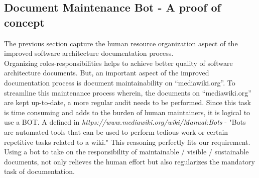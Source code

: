 \subsection{Document Maintenance Bot - A proof of concept}
\indent The previous section capture the human resource organization aspect of the improved software architecture documentation process.
\\\indent Organizing roles-responsibilities helps to achieve better quality of software architecture documents. But, an important aspect of the improved documentation process is document maintainability on \enquote{mediawiki.org}. To streamline this maintenance process wherein, the documents on \enquote{mediawiki.org} are kept up-to-date, a more regular audit needs to be performed. Since this task is time consuming and adds to the burden of human maintainers, it is logical to use a BOT. A defined in \emph{https://www.mediawiki.org/wiki/Manual:Bots} - "Bots are automated tools that can be used to perform tedious work or certain repetitive tasks related to a wiki." This reasoning perfectly fits our requirement. Using a bot to take on the responsibility of maintainable / visible / sustainable documents, not only relieves the human effort but also regularizes the mandatory task of documentation.


